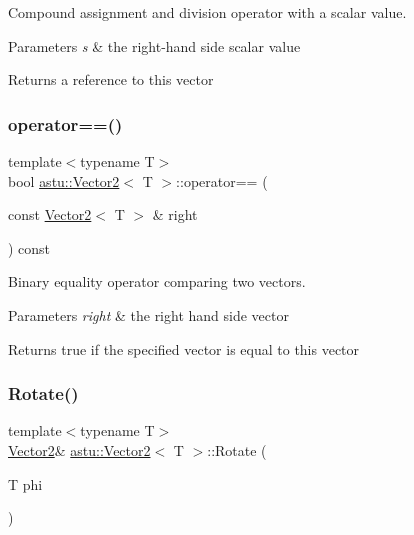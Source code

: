 Compound assignment and division operator with a scalar value.


\begin{DoxyParams}{Parameters}
{\em s} & the right-\/hand side scalar value \\
\hline
\end{DoxyParams}
\begin{DoxyReturn}{Returns}
a reference to this vector 
\end{DoxyReturn}
\mbox{\label{classastu_1_1Vector2_ada7f1d693330e7671cb1f951d8011c08}} 
\subsubsection{\texorpdfstring{operator==()}{operator==()}}
{\footnotesize\ttfamily template$<$typename T$>$ \\
bool \hyperlink{classastu_1_1Vector2}{astu\+::\+Vector2}$<$ T $>$\+::operator== (\begin{DoxyParamCaption}\item[{const \hyperlink{classastu_1_1Vector2}{Vector2}$<$ T $>$ \&}]{right }\end{DoxyParamCaption}) const\hspace{0.3cm}{\ttfamily [inline]}}

Binary equality operator comparing two vectors.


\begin{DoxyParams}{Parameters}
{\em right} & the right hand side vector \\
\hline
\end{DoxyParams}
\begin{DoxyReturn}{Returns}
{\ttfamily true} if the specified vector is equal to this vector 
\end{DoxyReturn}
\mbox{\label{classastu_1_1Vector2_ac2b10a554fede91faa5a0668ebe76697}} 
\subsubsection{\texorpdfstring{Rotate()}{Rotate()}}
{\footnotesize\ttfamily template$<$typename T$>$ \\
\hyperlink{classastu_1_1Vector2}{Vector2}\& \hyperlink{classastu_1_1Vector2}{astu\+::\+Vector2}$<$ T $>$\+::Rotate (\begin{DoxyParamCaption}\item[{T}]{phi }\end{DoxyParamCaption})\hspace{0.3cm}{\ttfamily [inline]}}

